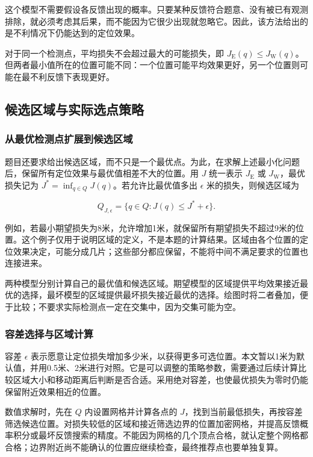这个模型不需要假设各反馈出现的概率。只要某种反馈符合题意、没有被已有观测排除，就必须考虑其后果，而不能因为它很少出现就忽略它。因此，该方法给出的是不利情况下仍能达到的定位效果。

对于同一个检测点，平均损失不会超过最大的可能损失，即 \(J_{\mathrm E}(q)\le J_{\mathrm W}(q)\)。但两者最小值所在的位置可能不同：一个位置可能平均效果更好，另一个位置则可能在最不利反馈下表现更好。

\subsection{候选区域与实际选点策略}

\subsubsection{从最优检测点扩展到候选区域}

题目还要求给出候选区域，而不只是一个最优点。为此，在求解上述最小化问题后，保留所有定位效果与最优值相差不大的位置。用 \(J\) 统一表示 \(J_{\mathrm E}\) 或 \(J_{\mathrm W}\)，最优损失记为 \(J^*=\inf_{q\in Q}J(q)\)。若允许比最优值多出 \(\epsilon\) 米的损失，则候选区域为

\begin{equation}
 Q_{J,\epsilon}=\{q\in Q:J(q)\le J^*+\epsilon\}.
 \label{eq:q2-candidate-region}
\end{equation}

例如，若最小期望损失为8米，允许增加1米，就保留所有期望损失不超过9米的位置。这个例子仅用于说明区域的定义，不是本题的计算结果。区域由各个位置的定位效果决定，可能分成几片；这些部分都应保留，不能将中间不满足要求的位置也连接进来。

两种模型分别计算自己的最优值和候选区域。期望模型的区域提供平均效果接近最优的选择，最坏模型的区域提供最坏损失接近最优的选择。绘图时将二者叠加，便于比较；不要求实际检测点一定在交集中，因为交集可能为空。

\subsubsection{容差选择与区域计算}

容差 \(\epsilon\) 表示愿意让定位损失增加多少米，以获得更多可选位置。本文暂以1米为默认值，并用0.5米、2米进行对照。它是可以调整的策略参数，需要通过后续计算比较区域大小和移动距离后判断是否合适。采用绝对容差，也使最优损失为零时仍能保留附近效果相近的位置。

数值求解时，先在 \(Q\) 内设置网格并计算各点的 \(J\)，找到当前最低损失，再按容差筛选候选位置。对损失较低的区域和接近筛选边界的位置加密网格，并提高反馈概率积分或最坏反馈搜索的精度。不能因为网格的几个顶点合格，就认定整个网格都合格；边界附近尚不能确认的位置应继续检查，最终推荐点也要单独复算。

